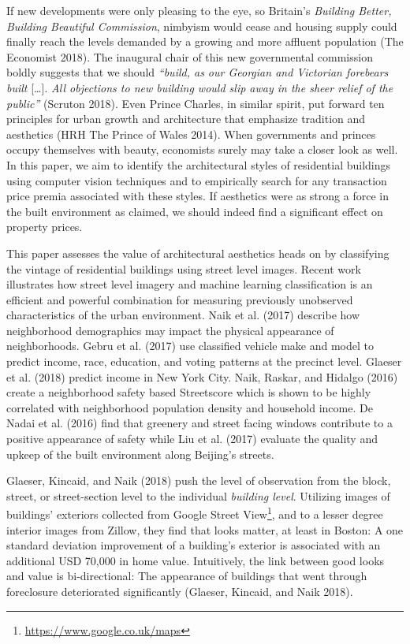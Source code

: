 \documentclass[]{article}
\let\rmarkdownfootnote\footnote%
\def\footnote{\protect\rmarkdownfootnote}
\begin{document}
If new developments were only pleasing to the eye, so Britain's
\emph{Building Better, Building Beautiful Commission}, nimbyism would
cease and housing supply could finally reach the levels demanded by a
growing and more affluent population (The Economist 2018). The inaugural
chair of this new governmental commission boldly suggests that we should
\emph{``build, as our Georgian and Victorian forebears built}
{[}\ldots{}{]}. \emph{All objections to new building would slip away in
the sheer relief of the public''} (Scruton 2018). Even Prince Charles,
in similar spirit, put forward ten principles for urban growth and
architecture that emphasize tradition and aesthetics (HRH The Prince of
Wales 2014). When governments and princes occupy themselves with beauty,
economists surely may take a closer look as well. In this paper, we aim
to identify the architectural styles of residential buildings using
computer vision techniques and to empirically search for any transaction
price premia associated with these styles. If aesthetics were as strong
a force in the built environment as claimed, we should indeed find a
significant effect on property prices.

This paper assesses the value of architectural aesthetics heads on by
classifying the vintage of residential buildings using street level
images. Recent work illustrates how street level imagery and machine
learning classification is an efficient and powerful combination for
measuring previously unobserved characteristics of the urban
environment. Naik et al. (2017) describe how neighborhood demographics
may impact the physical appearance of neighborhoods. Gebru et al. (2017)
use classified vehicle make and model to predict income, race,
education, and voting patterns at the precinct level. Glaeser et al.
(2018) predict income in New York City. Naik, Raskar, and Hidalgo (2016)
create a neighborhood safety based Streetscore which is shown to be
highly correlated with neighborhood population density and household
income. De Nadai et al. (2016) find that greenery and street facing
windows contribute to a positive appearance of safety while Liu et al.
(2017) evaluate the quality and upkeep of the built environment along
Beijing's streets.

Glaeser, Kincaid, and Naik (2018) push the level of observation from the
block, street, or street-section level to the individual
\emph{building level}. Utilizing images of buildings' exteriors
collected from Google Street
View\footnote{\href{https://www.google.co.uk/maps}{https://www.google.co.uk/maps}},
and to a lesser degree interior images from Zillow, they find that looks
matter, at least in Boston: A one standard deviation improvement of a
building's exterior is associated with an additional USD 70,000 in home
value. Intuitively, the link between good looks and value is
bi-directional: The appearance of buildings that went through
foreclosure deteriorated significantly (Glaeser, Kincaid, and Naik
2018).
\end{document}
